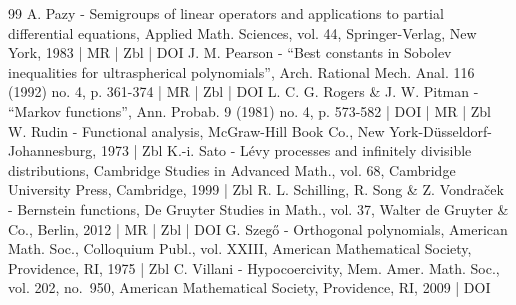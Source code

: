 \documentclass[10pt]{amsart}
\theoremstyle{plain}
\theoremstyle{definition}
\begin{document}
\begin{thebibliography}{99}
A. Pazy - Semigroups of linear operators and applications to partial differential equations, Applied Math. Sciences, vol. 44, Springer-Verlag, New York, 1983 | MR | Zbl | DOI
J. M. Pearson - “Best constants in Sobolev inequalities for ultraspherical polynomials”, Arch. Rational Mech. Anal. 116 (1992) no. 4, p. 361-374 | MR | Zbl | DOI
L. C. G. Rogers \& J. W. Pitman - “Markov functions”, Ann. Probab. 9 (1981) no. 4, p. 573-582 | DOI | MR | Zbl
W. Rudin - Functional analysis, McGraw-Hill Book Co., New York-Düsseldorf-Johannesburg, 1973 | Zbl
K.-i. Sato - Lévy processes and infinitely divisible distributions, Cambridge Studies in Advanced Math., vol. 68, Cambridge University Press, Cambridge, 1999 | Zbl
R. L. Schilling, R. Song \& Z. Vondraček - Bernstein functions, De Gruyter Studies in Math., vol. 37, Walter de Gruyter \& Co., Berlin, 2012 | MR | Zbl | DOI
G. Szegő - Orthogonal polynomials, American Math. Soc., Colloquium Publ., vol. XXIII, American Mathematical Society, Providence, RI, 1975 | Zbl
C. Villani - Hypocoercivity, Mem. Amer. Math. Soc., vol. 202, no. 950, American Mathematical Society, Providence, RI, 2009 | DOI
\end{thebibliography}
\end{document}
